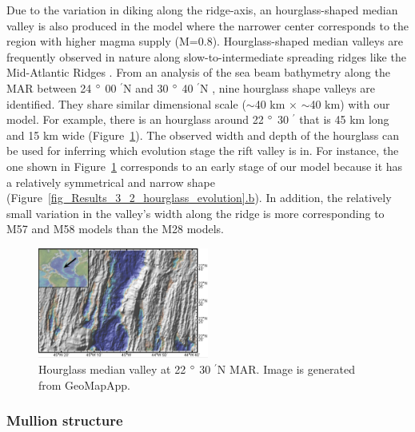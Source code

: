 Due to the variation in diking along the ridge-axis, an hourglass-shaped median valley is also produced in the model where the narrower center corresponds to the region with higher magma supply (M=$0.8$). Hourglass-shaped median valleys are frequently observed in nature along slow-to-intermediate spreading ridges like the Mid-Atlantic Ridges \citep{Sempere1993}. From an analysis of the sea beam bathymetry along the MAR between 24 $\degree$ 00 $^{\prime}$N and 30 $\degree$ 40 $^{\prime}$N \citep{Sempere1993}, nine hourglass shape valleys are identified. They share similar dimensional scale ($\sim$40 km $\times$ $\sim$40 km) with our model. For example, there is an hourglass around 22 $\degree$ 30 $^{\prime}$ that is 45 km long and 15 km wide (Figure~\hyperref[fig_Discussion_Observation_4_hourglass_22N_MAR]{\ref{fig_Discussion_Observation_4_hourglass_22N_MAR}}). The observed width and depth of the hourglass can be used for inferring which evolution stage the rift valley is in. For instance, the one shown in Figure~\hyperref[fig_Discussion_Observation_4_hourglass_22N_MAR]{\ref{fig_Discussion_Observation_4_hourglass_22N_MAR}} corresponds to an early stage of our model because it has a relatively symmetrical and narrow shape (Figure~\hyperref[fig_Results_3_2_hourglass_evolution]{\ref{fig_Results_3_2_hourglass_evolution}.b}). In addition, the relatively small variation in the valley's width along the ridge is more corresponding to M57 and M58 models than the M28 models. 

\begin{figure}[h]
  \centering
    \includegraphics[width=0.5\textwidth]{./Figures/fig_Discussion_Observation_4_hourglass_22N_MAR.eps}
  \caption[Hourglass median valley at 22 $\degree$ 30 $^{\prime}$N MAR.]{Hourglass median valley at 22 $\degree$ 30 $^{\prime}$N MAR. Image is generated from GeoMapApp.}
 \label{fig_Discussion_Observation_4_hourglass_22N_MAR}
\end{figure}   

\subsubsection{Mullion structure}

